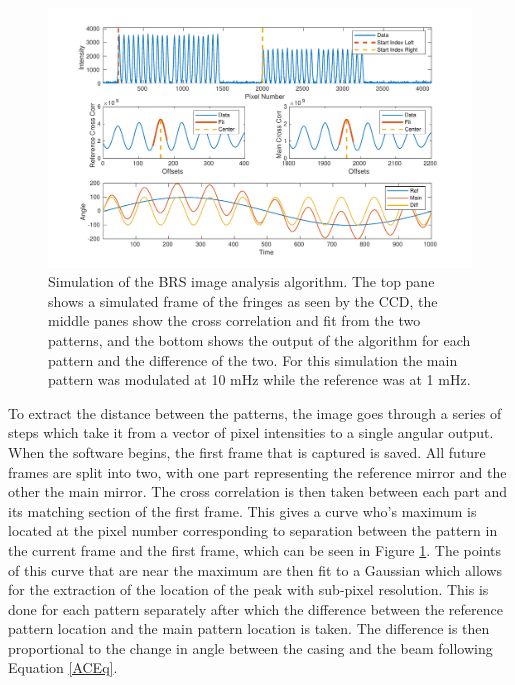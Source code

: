 \documentclass [12pt, proquest]{uwthesis}[2019]
\begin{document}
\begin{figure}[!h]
\begin{center}
 \includegraphics[width=\textwidth]{BRS_ImgAnalysis.pdf}
\caption[Simulation of the BRS image analysis algorithm]{Simulation of the BRS image analysis algorithm. The top pane shows a simulated frame of the fringes as seen by the CCD, the middle panes show the cross correlation and fit from the two patterns, and the bottom shows the output of the algorithm for each pattern and the difference of the two. For this simulation the main pattern was modulated at 10 mHz while the reference was at 1 mHz.}
\label{ImgAnalysis}
\end{center}
\end{figure}

To extract the distance between the patterns, the image goes through a series of steps which take it from a vector of pixel intensities to a single angular output. When the software begins, the first frame that is captured is saved. All future frames are split into two, with one part representing the reference mirror and the other the main mirror. The cross correlation is then taken between each part and its matching section of the first frame. This gives a curve who's maximum is located at the pixel number corresponding to separation between the pattern in the current frame and the first frame, which can be seen in Figure \ref{ImgAnalysis}. The points of this curve that are near the maximum are then fit to a Gaussian which allows for the extraction of the location of the peak with sub-pixel resolution. This is done for each pattern separately after which the difference between the reference pattern location and the main pattern location is taken. The difference is then proportional to the change in angle between the casing and the beam following Equation \ref{ACEq}.
\end{document}

